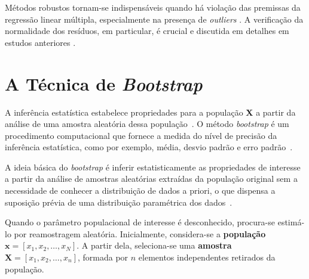 Métodos robustos tornam-se indispensáveis quando há violação das premissas da regressão linear múltipla, especialmente na presença de \textit{outliers} \cite{Alin2017,Filzmoser2013}. A verificação da normalidade dos resíduos, em particular, é crucial e discutida em detalhes em estudos anteriores \cite{Alin2017,Filzmoser2013}.


\section{A Técnica de \textit{Bootstrap}}

A inferência estatística estabelece propriedades para a população \textbf{X} a partir da análise
de uma amostra aleatória dessa população~\cite{DRAPER:1998,JOHNSON:2001,CHATTERJEE:2006}. O método \textit{bootstrap} é um procedimento computacional que fornece a medida do nível de precisão da inferência estatística, como por exemplo, média, desvio padrão e erro padrão~\cite{yeon2023,alfons2022,wan2023,du2024,jensen2024}.

A ideia básica do \textit{bootstrap} é inferir estatisticamente as propriedades de interesse a partir da análise de amostras aleatórias extraídas da população original sem a necessidade de conhecer a distribuição de dados a priori, o que dispensa a suposição prévia de uma distribuição paramétrica dos dados~\cite{HARDLE:2007,TIMM:2002}.

Quando o parâmetro populacional de interesse é desconhecido, procura-se estimá-lo por
reamostragem aleatória. Inicialmente, considera-se a \textbf{população} 
$\mathbf{x} = [x_1, x_2, \ldots, x_N]$. A partir dela, seleciona-se uma 
\textbf{amostra} $\mathbf{X} = [x_1, x_2, \ldots, x_n]$, formada por $n$ elementos 
independentes retirados da população. 

